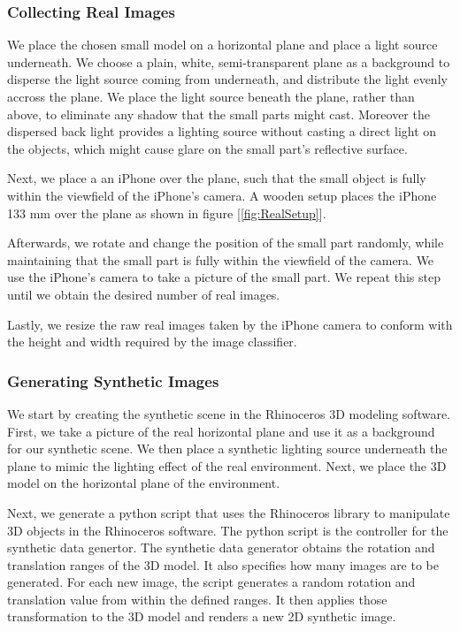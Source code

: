 \subsubsection{Collecting Real Images}
We place the chosen small model on a horizontal plane and place a light source underneath. We choose a plain, white, semi-transparent plane as a background to disperse the light source coming from underneath, and distribute the light evenly accross the plane. We place the light source beneath the plane, rather than above, to eliminate any shadow that the small parts might cast. Moreover the dispersed back light provides a lighting source without casting a direct light on the objects, which might cause glare on the small part's reflective surface.

Next, we place a an iPhone over the plane, such that the small object is fully within the viewfield of the iPhone's camera. A wooden setup places the iPhone 133 mm over the plane as shown in figure [\ref{fig:RealSetup}].

Afterwards, we rotate and change the position of the small part randomly, while maintaining that the small part is fully within the viewfield of the camera. We use the iPhone's camera to take a picture of the small part. We repeat this step until we obtain the desired number of real images.

Lastly, we resize the raw real images taken by the iPhone camera to conform with the height and width required by the image classifier.

\subsubsection{Generating Synthetic Images}
We start by creating the synthetic scene in the Rhinoceros 3D modeling software. First, we take a picture of the real horizontal plane and use it as a background for our synthetic scene. We then place a synthetic lighting source underneath the plane to mimic the lighting effect of the real environment. Next, we place the 3D model on the horizontal plane of the environment.

Next, we generate a python script that uses the Rhinoceros library to manipulate 3D objects in the Rhinoceros software. The python script is the controller for the synthetic data genertor. The synthetic data generator obtains the rotation and translation ranges of the 3D model. It also specifies how many images are to be generated. For each new image, the script generates a random rotation and translation value from within the defined ranges. It then applies those transformation to the 3D model and renders a new 2D synthetic image.

